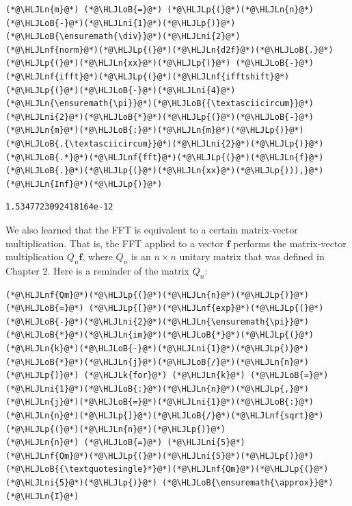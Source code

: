 \documentclass[12pt,a4paper]{article}
\newcommand{\HLJLk}[1]{\textcolor[RGB]{148,91,176}{\textbf{#1}}}
\newcommand{\HLJLn}[1]{#1}
\newcommand{\HLJLnf}[1]{\textcolor[RGB]{66,102,213}{#1}}
\newcommand{\HLJLni}[1]{\textcolor[RGB]{59,151,46}{#1}}
\newcommand{\HLJLoB}[1]{\textcolor[RGB]{102,102,102}{\textbf{#1}}}
\newcommand{\HLJLp}[1]{#1}
\begin{document}
\begin{lstlisting}
(*@\HLJLn{m}@*) (*@\HLJLoB{=}@*) (*@\HLJLp{(}@*)(*@\HLJLn{n}@*)(*@\HLJLoB{-}@*)(*@\HLJLni{1}@*)(*@\HLJLp{)}@*)(*@\HLJLoB{\ensuremath{\div}}@*)(*@\HLJLni{2}@*)
(*@\HLJLnf{norm}@*)(*@\HLJLp{(}@*)(*@\HLJLn{d2f}@*)(*@\HLJLoB{.}@*)(*@\HLJLp{(}@*)(*@\HLJLn{xx}@*)(*@\HLJLp{)}@*) (*@\HLJLoB{-}@*) (*@\HLJLnf{ifft}@*)(*@\HLJLp{(}@*)(*@\HLJLnf{ifftshift}@*)(*@\HLJLp{(}@*)(*@\HLJLoB{-}@*)(*@\HLJLni{4}@*)(*@\HLJLn{\ensuremath{\pi}}@*)(*@\HLJLoB{{\textasciicircum}}@*)(*@\HLJLni{2}@*)(*@\HLJLoB{*}@*)(*@\HLJLp{(}@*)(*@\HLJLoB{-}@*)(*@\HLJLn{m}@*)(*@\HLJLoB{:}@*)(*@\HLJLn{m}@*)(*@\HLJLp{)}@*)(*@\HLJLoB{.{\textasciicircum}}@*)(*@\HLJLni{2}@*)(*@\HLJLp{)}@*) (*@\HLJLoB{.*}@*)(*@\HLJLnf{fft}@*)(*@\HLJLp{(}@*)(*@\HLJLn{f}@*)(*@\HLJLoB{.}@*)(*@\HLJLp{(}@*)(*@\HLJLn{xx}@*)(*@\HLJLp{))),}@*) (*@\HLJLn{Inf}@*)(*@\HLJLp{)}@*)
\end{lstlisting}

\begin{lstlisting}
1.5347723092418164e-12
\end{lstlisting}


We also learned that the FFT is equivalent to a certain matrix-vector multiplication.  That is, the FFT applied to a vector $\mathbf{f}$ performs the matrix-vector multiplication $Q_n \mathbf{f}$, where $Q_n$ is an $n\times n$ unitary matrix that was defined in Chapter 2. Here is a reminder of the matrix $Q_n$:


\begin{lstlisting}
(*@\HLJLnf{Qm}@*)(*@\HLJLp{(}@*)(*@\HLJLn{n}@*)(*@\HLJLp{)}@*) (*@\HLJLoB{=}@*) (*@\HLJLp{[}@*)(*@\HLJLnf{exp}@*)(*@\HLJLp{(}@*)(*@\HLJLoB{-}@*)(*@\HLJLni{2}@*)(*@\HLJLn{\ensuremath{\pi}}@*)(*@\HLJLoB{*}@*)(*@\HLJLn{im}@*)(*@\HLJLoB{*}@*)(*@\HLJLp{(}@*)(*@\HLJLn{k}@*)(*@\HLJLoB{-}@*)(*@\HLJLni{1}@*)(*@\HLJLp{)}@*)(*@\HLJLoB{*}@*)(*@\HLJLn{j}@*)(*@\HLJLoB{/}@*)(*@\HLJLn{n}@*)(*@\HLJLp{)}@*) (*@\HLJLk{for}@*) (*@\HLJLn{k}@*) (*@\HLJLoB{=}@*) (*@\HLJLni{1}@*)(*@\HLJLoB{:}@*)(*@\HLJLn{n}@*)(*@\HLJLp{,}@*) (*@\HLJLn{j}@*)(*@\HLJLoB{=}@*)(*@\HLJLni{1}@*)(*@\HLJLoB{:}@*)(*@\HLJLn{n}@*)(*@\HLJLp{]}@*)(*@\HLJLoB{/}@*)(*@\HLJLnf{sqrt}@*)(*@\HLJLp{(}@*)(*@\HLJLn{n}@*)(*@\HLJLp{)}@*)
(*@\HLJLn{n}@*) (*@\HLJLoB{=}@*) (*@\HLJLni{5}@*)
(*@\HLJLnf{Qm}@*)(*@\HLJLp{(}@*)(*@\HLJLni{5}@*)(*@\HLJLp{)}@*)(*@\HLJLoB{{\textquotesingle}*}@*)(*@\HLJLnf{Qm}@*)(*@\HLJLp{(}@*)(*@\HLJLni{5}@*)(*@\HLJLp{)}@*) (*@\HLJLoB{\ensuremath{\approx}}@*) (*@\HLJLn{I}@*)
\end{lstlisting}
\end{document}
